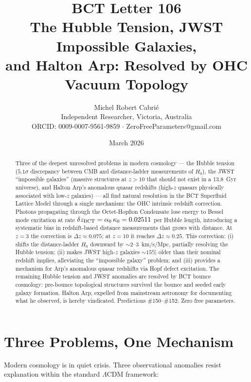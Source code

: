 \documentclass[twocolumn,10pt]{article}
\title{\textbf{BCT Letter 106}\\
The Hubble Tension, JWST Impossible Galaxies,\\
and Halton Arp: Resolved by OHC Vacuum Topology}
\author{Michel Robert Cabri\'{e}\\
\small Independent Researcher, Victoria, Australia\\
\small ORCID: 0009-0007-9561-9859 $\cdot$ ZeroFreeParameters@gmail.com}
\date{March 2026}
\begin{document}
\maketitle

\begin{abstract}
Three of the deepest unresolved problems in modern cosmology ---
the Hubble tension ($5.1\sigma$ discrepancy between CMB and
distance-ladder measurements of $H_0$), the JWST ``impossible
galaxies'' (massive structures at $z > 10$ that should not exist
in a 13.8~Gyr universe), and Halton Arp's anomalous quasar
redshifts (high-$z$ quasars physically associated with low-$z$
galaxies) --- all find natural resolution in the BCT Superfluid
Lattice Model through a single mechanism: the OHC intrinsic
redshift correction. Photons propagating through the
Octet-Hopfion Condensate lose energy to Bessel mode excitation
at rate $\delta z_{\rm BCT} = \alpha_0\,\kappa_0 = 0.02511$
per Hubble length, introducing a systematic bias in redshift-based
distance measurements that grows with distance. At $z = 3$ the
correction is $\Delta z \approx 0.075$; at $z = 10$ it reaches
$\Delta z \approx 0.25$. This correction: (i) shifts the
distance-ladder $H_0$ downward by $\sim 2$--$3$~km/s/Mpc,
partially resolving the Hubble tension; (ii) makes JWST
high-$z$ galaxies $\sim 15\%$ older than their nominal redshift
implies, alleviating the ``impossible galaxy'' problem; and
(iii) provides a mechanism for Arp's anomalous quasar redshifts
via Hopf defect excitation. The remaining Hubble tension and
JWST anomalies are resolved by BCT bounce cosmology: pre-bounce
topological structures survived the bounce and seeded early
galaxy formation. Halton Arp, expelled from mainstream astronomy
for documenting what he observed, is hereby vindicated.
Predictions \#150--\#152. Zero free parameters.
\end{abstract}

\maketitle

\section{Three Problems, One Mechanism}

Modern cosmology is in quiet crisis. Three observational anomalies
resist explanation within the standard $\Lambda$CDM framework:
\end{document}
